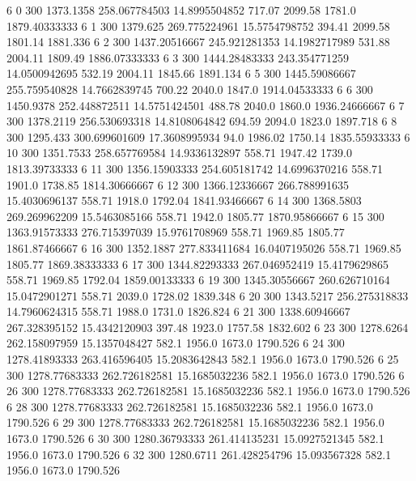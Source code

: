 6  0  300  1373.1358  258.067784503  14.8995504852  717.07  2099.58  1781.0  1879.40333333 
6  1  300  1379.625  269.775224961  15.5754798752  394.41  2099.58  1801.14  1881.336 
6  2  300  1437.20516667  245.921281353  14.1982717989  531.88  2004.11  1809.49  1886.07333333 
6  3  300  1444.28483333  243.354771259  14.0500942695  532.19  2004.11  1845.66  1891.134 
6  5  300  1445.59086667  255.759540828  14.7662839745  700.22  2040.0  1847.0  1914.04533333 
6  6  300  1450.9378  252.448872511  14.5751424501  488.78  2040.0  1860.0  1936.24666667 
6  7  300  1378.2119  256.530693318  14.8108064842  694.59  2094.0  1823.0  1897.718 
6  8  300  1295.433  300.699601609  17.3608995934  94.0  1986.02  1750.14  1835.55933333 
6  10  300  1351.7533  258.657769584  14.9336132897  558.71  1947.42  1739.0  1813.39733333 
6  11  300  1356.15903333  254.605181742  14.6996370216  558.71  1901.0  1738.85  1814.30666667 
6  12  300  1366.12336667  266.788991635  15.4030696137  558.71  1918.0  1792.04  1841.93466667 
6  14  300  1368.5803  269.269962209  15.5463085166  558.71  1942.0  1805.77  1870.95866667 
6  15  300  1363.91573333  276.715397039  15.9761708969  558.71  1969.85  1805.77  1861.87466667 
6  16  300  1352.1887  277.833411684  16.0407195026  558.71  1969.85  1805.77  1869.38333333 
6  17  300  1344.82293333  267.046952419  15.4179629865  558.71  1969.85  1792.04  1859.00133333 
6  19  300  1345.30556667  260.626710164  15.0472901271  558.71  2039.0  1728.02  1839.348 
6  20  300  1343.5217  256.275318833  14.7960624315  558.71  1988.0  1731.0  1826.824 
6  21  300  1338.60946667  267.328395152  15.4342120903  397.48  1923.0  1757.58  1832.602 
6  23  300  1278.6264  262.158097959  15.1357048427  582.1  1956.0  1673.0  1790.526 
6  24  300  1278.41893333  263.416596405  15.2083642843  582.1  1956.0  1673.0  1790.526 
6  25  300  1278.77683333  262.726182581  15.1685032236  582.1  1956.0  1673.0  1790.526 
6  26  300  1278.77683333  262.726182581  15.1685032236  582.1  1956.0  1673.0  1790.526 
6  28  300  1278.77683333  262.726182581  15.1685032236  582.1  1956.0  1673.0  1790.526 
6  29  300  1278.77683333  262.726182581  15.1685032236  582.1  1956.0  1673.0  1790.526 
6  30  300  1280.36793333  261.414135231  15.0927521345  582.1  1956.0  1673.0  1790.526 
6  32  300  1280.6711  261.428254796  15.093567328  582.1  1956.0  1673.0  1790.526 

